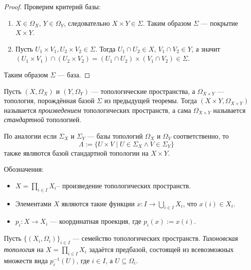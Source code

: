 \documentclass[12pt,a4paper]{article}
\begin{document}
    \begin{proof}
        Проверим критерий базы:
        \begin{enumerate}
            \item $X \in \Omega_X$, $Y \in \Omega_Y$, следовательно $X \times Y \in \Sigma$. Таким образом $\Sigma$ --- покрытие $X \times Y$.
            \item Пусть $U_1 \times V_1, U_2 \times V_2 \in \Sigma$. Тогда $U_1 \cap U_2 \in X$, $V_1 \cap V_2 \in Y$, а значит $(U_1 \times V_1) \cap (U_2 \times V_2) = (U_1 \cap U_2) \times (V_1 \cap V_2) \in \Sigma$.
        \end{enumerate}
        Таким образом $\Sigma$ --- база.
    \end{proof}

    \begin{definition}
        Пусть $(X, \Omega_X)$ и $(Y, \Omega_Y)$ --- топологические пространства, а $\Omega_{X \times Y}$ --- топология, порождённая базой $\Sigma$ из предыдущей теоремы. Тогда $(X \times Y, \Omega_{X \times Y})$ называется \emph{произведением} топологических пространств, а сама $\Omega_{X \times Y}$ называется \emph{стандартной} топологией.
    \end{definition}

    \begin{remark}
        По аналогии если $\Sigma_X$ и $\Sigma_Y$ --- базы топологий $\Omega_X$ и $\Omega_Y$ соответственно, то
        \[\Lambda := \{U \times V \mid U \in \Sigma_X \wedge V \in \Sigma_Y\}\]
        также являются базой стандартной топологии на $X \times Y$.
    \end{remark}

    \begin{definition}
        Обозначения:
        \begin{itemize}
            \item $X = \prod_{i \in I} X_i$– произведение топологических пространств.
            \item Элементами $X$ являются такие функции $x: I \to \bigcup_{i \in I} X_i$, что $x(i) \in X_i$.
            \item $p_i: X \to X_i$ --- координатная проекция, где $p_i(x) := x(i)$.
        \end{itemize}
    \end{definition}

    \begin{definition}
        Пусть $\{(X_i, \Omega_i)\}_{i \in I}$ --- семейство топологических пространств. \emph{Тихоновская топология} на $X = \prod_{i \in I} X_i$ задаётся предбазой, состоящей из всевозможных множеств вида $p_i^{-1}(U)$, где $i \in I$, а $U \subseteq \Omega_i$.
    \end{definition}
\end{document}
